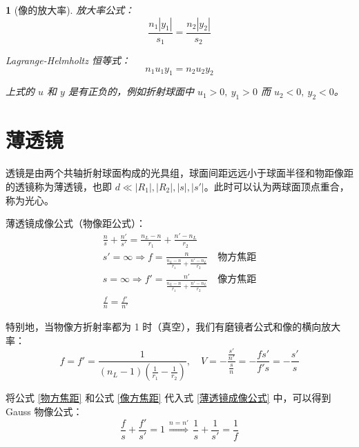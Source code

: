 \documentclass[UTF8]{report}
\theoremstyle{MyLineTheoremStyle} %
\theoremstyle{MyBlockTheoremStyle} %
\theoremstyle{MySubsubsectionStyle} %
\newtheorem{definition}{}
\begin{document}
\begin{definition}[像的放大率]
放大率公式：
\begin{equation}
\frac{n_1 | y_1 |}{s_1} = \frac{n_2 | y_2 |}{s_2}
\end{equation}

Lagrange-Helmholtz 恒等式：
\begin{equation}
n_1u_1y_1 = n_2u_2y_2
\end{equation}

上式的 $u$ 和 $y$ 是有正负的，例如折射球面中 $u_1 > 0,\ y_1 >0$ 而 $u_2 <0,\ y_2 < 0$。

\end{definition}



\section{薄透镜}

透镜是由两个共轴折射球面构成的光具组，球面间距远远小于球面半径和物距像距的透镜称为薄透镜，也即 $d \ll | R_1 |, | R_2 |, | s |, | s' |$。此时可以认为两球面顶点重合，称为光心。

薄透镜成像公式（物像距公式）：
\begin{gather} 
\frac{n}{s} + \frac{n'}{s'} = \frac{n_L - n}{r_1} + \frac{n' - n_L}{r_2} \label{薄透镜成像公式} \\
s' = \infty \Longrightarrow  f = \frac{n}{\frac{n_L - n}{r_1} + \frac{n' - n_L}{r_2}}\quad \text{物方焦距} \label{物方焦距} \\ 
s = \infty \Longrightarrow  f' = \frac{n'}{\frac{n_L - n}{r_1} + \frac{n' - n_L}{r_2}}\quad \text{像方焦距} \label{像方焦距}\\ 
\frac{f}{n} = \frac{f'}{n'}
\end{gather}

特别地，当物像方折射率都为 1 时（真空），我们有磨镜者公式和像的横向放大率：
\begin{equation}
f =f' = \frac{1}{(n_L - 1)(\frac{1}{r_1} - \frac{1}{r_2})},\quad  V = -\frac{\frac{s'}{n'}}{\frac{s}{n}} = -\frac{fs'}{f's} =  - \frac{s'}{s}
\end{equation}


将公式 \ref{物方焦距} 和公式 \ref{像方焦距} 代入式 \ref{薄透镜成像公式} 中，可以得到 Gauss 物像公式：
\begin{equation}
\frac{f}{s} + \frac{f'}{s'} = 1 \overset{n = n'}{\ \ \ \Longrightarrow\ \ \  } \frac{1}{s} + \frac{1}{s'} = \frac{1}{f}
\label{Gauss物像公式}
\end{equation}
\end{document}
